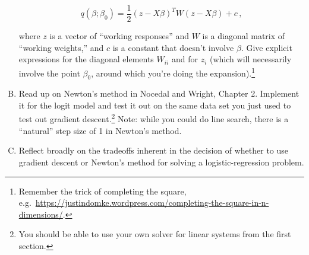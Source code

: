 \documentclass{article}
\begin{document}
\begin{enumerate}[(A)]
$$

q(\beta; \beta_0) = \frac{1}{2}(z - X \beta)^T W (z - X \beta) + c\, ,

$$



where $z$ is a vector of ``working responses'' and $W$ is a diagonal matrix of ``working weights,'' and $c$ is a constant that doesn't involve $\beta$.  Give explicit expressions for the diagonal elements $W_{ii}$ and for $z_i$ (which will necessarily involve the point $\beta_0$, around which you're doing the expansion).\footnote{Remember the trick of completing the square, e.g.~\url{https://justindomke.wordpress.com/completing-the-square-in-n-dimensions/}.}







\item Read up on Newton's method in Nocedal and Wright, Chapter 2.  Implement it for the logit model and test it out on the same data set you just used to test out gradient descent.\footnote{You should be able to use your own solver for linear systems from the first section.}  Note: while you could do line search, there is a ``natural'' step size of 1 in Newton's method.







\item Reflect broadly on the tradeoffs inherent in the decision of whether to use gradient descent or Newton's method for solving a logistic-regression problem.



















\end{enumerate}
\end{document}
